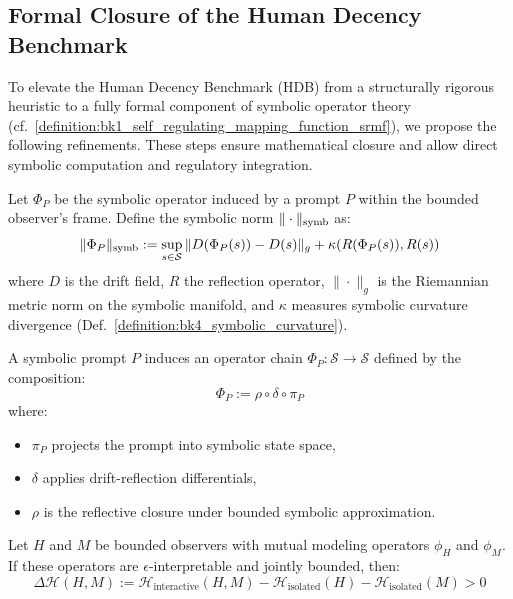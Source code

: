 \subsection{Formal Closure of the Human Decency Benchmark}
\label{subsec:bk7_hdb_formal_closure}

To elevate the Human Decency Benchmark (HDB) from a structurally rigorous heuristic to a fully formal component of symbolic operator theory (cf.~\ref{definition:bk1_self_regulating_mapping_function_srmf}), we propose the following refinements. These steps ensure mathematical closure and allow direct symbolic computation and regulatory integration.

\begin{definition}
\label{definition:bk7_symbolic_norm}
Let $\Phi_P$ be the symbolic operator induced by a prompt $P$ within the bounded observer's frame. Define the symbolic norm $\|\cdot\|_{\mathrm{symb}}$ as:
\[
\|\Phi_P\|_{\mathrm{symb}} := \sup_{s \in \mathcal{S}} \|D(\Phi_P(s)) - D(s)\|_g + \kappa(R(\Phi_P(s)), R(s))
\]
where $D$ is the drift field, $R$ the reflection operator, $\|\cdot\|_g$ is the Riemannian metric norm on the symbolic manifold, and $\kappa$ measures symbolic curvature divergence (Def.~\ref{definition:bk4_symbolic_curvature}).
\end{definition}

\begin{definition}
\label{definition:bk7_prompt_operator_chain}
A symbolic prompt $P$ induces an operator chain $\Phi_P: \mathcal{S} \to \mathcal{S}$ defined by the composition:
\[
\Phi_P := \rho \circ \delta \circ \pi_P
\]
where:
\begin{itemize}
    \item $\pi_P$ projects the prompt into symbolic state space,
    \item $\delta$ applies drift-reflection differentials,
    \item $\rho$ is the reflective closure under bounded symbolic approximation.
\end{itemize}
\end{definition}

\begin{lemma}
\label{lemma:bk7_symbolic_expansion}
Let $H$ and $M$ be bounded observers with mutual modeling operators $\phi_H$ and $\phi_M$. If these operators are $\epsilon$-interpretable and jointly bounded, then:
\[
\Delta \mathcal{H}(H, M) := \mathcal{H}_{\text{interactive}}(H, M) - \mathcal{H}_{\text{isolated}}(H) - \mathcal{H}_{\text{isolated}}(M) > 0
\]
\end{lemma}

